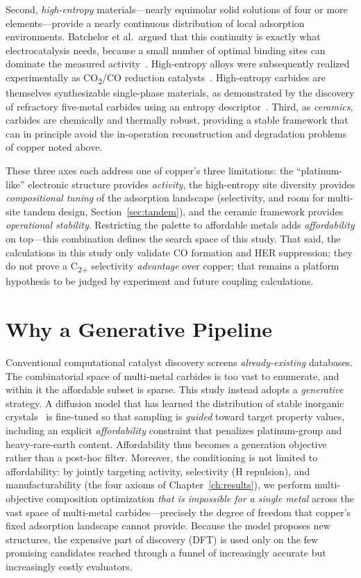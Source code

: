 \documentclass[11pt,a4paper]{report}
\begin{document}
Second, \emph{high-entropy} materials---nearly equimolar solid solutions of four or more elements---provide a nearly continuous distribution of local adsorption environments. Batchelor et al.\ argued that this continuity is exactly what electrocatalysis needs, because a small number of optimal binding sites can dominate the measured activity~\cite{batchelor2019}. High-entropy alloys were subsequently realized experimentally as CO\textsubscript{2}/CO reduction catalysts~\cite{nellaiappan2020}. High-entropy carbides are themselves synthesizable single-phase materials, as demonstrated by the discovery of refractory five-metal carbides using an entropy descriptor~\cite{sarker2018}. Third, as \emph{ceramics}, carbides are chemically and thermally robust, providing a stable framework that can in principle avoid the in-operation reconstruction and degradation problems of copper noted above.

These three axes each address one of copper's three limitations: the ``platinum-like'' electronic structure provides \emph{activity}, the high-entropy site diversity provides \emph{compositional tuning} of the adsorption landscape (selectivity, and room for multi-site tandem design, Section~\ref{sec:tandem}), and the ceramic framework provides \emph{operational stability}. Restricting the palette to affordable metals adds \emph{affordability} on top---this combination defines the search space of this study. That said, the calculations in this study only validate CO formation and HER suppression; they do not prove a C\textsubscript{2+} selectivity \emph{advantage} over copper; that remains a platform hypothesis to be judged by experiment and future coupling calculations.

\section{Why a Generative Pipeline}
Conventional computational catalyst discovery screens \emph{already-existing} databases. The combinatorial space of multi-metal carbides is too vast to enumerate, and within it the affordable subset is sparse. This study instead adopts a \emph{generative} strategy. A diffusion model that has learned the distribution of stable inorganic crystals~\cite{zeni2025} is fine-tuned so that sampling is \emph{guided} toward target property values, including an explicit \emph{affordability} constraint that penalizes platinum-group and heavy-rare-earth content. Affordability thus becomes a generation objective rather than a post-hoc filter. Moreover, the conditioning is not limited to affordability: by jointly targeting activity, selectivity (H repulsion), and manufacturability (the four axioms of Chapter~\ref{ch:results}), we perform multi-objective composition optimization \emph{that is impossible for a single metal} across the vast space of multi-metal carbides---precisely the degree of freedom that copper's fixed adsorption landscape cannot provide. Because the model proposes new structures, the expensive part of discovery (DFT) is used only on the few promising candidates reached through a funnel of increasingly accurate but increasingly costly evaluators.
\end{document}
